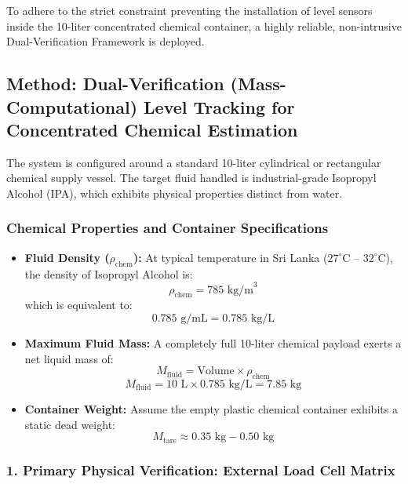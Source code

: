 \documentclass[12pt,a4paper]{article}
\begin{document}
To adhere to the strict constraint preventing the installation of level sensors inside the 10-liter concentrated chemical container, a highly reliable, non-intrusive Dual-Verification Framework is deployed.

\subsection{Method: Dual-Verification (Mass-Computational) Level Tracking for Concentrated Chemical Estimation}

The system is configured around a standard 10-liter cylindrical or rectangular chemical supply vessel. The target fluid handled is industrial-grade Isopropyl Alcohol (IPA), which exhibits physical properties distinct from water.

\subsubsection*{Chemical Properties and Container Specifications}

\begin{itemize}
    \item \textbf{Fluid Density ($\rho_{\text{chem}}$):}
    At typical temperature in Sri Lanka ($27^\circ$C -- $32^\circ$C), the density of Isopropyl Alcohol is:
    \[
    \rho_{\text{chem}} = 785 \text{ kg/m}^3
    \]
    which is equivalent to:
    \[
    0.785 \text{ g/mL} = 0.785 \text{ kg/L}
    \]

    \item \textbf{Maximum Fluid Mass:}
    A completely full 10-liter chemical payload exerts a net liquid mass of:
    \[
    M_{\text{fluid}} = \text{Volume} \times \rho_{\text{chem}}
    \]
    \[
    M_{\text{fluid}} = 10\text{ L} \times 0.785\text{ kg/L} = 7.85\text{ kg}
    \]

    \item \textbf{Container Weight:}
    Assume the empty plastic chemical container exhibits a static dead weight:
    \[
    M_{\text{tare}} \approx 0.35\text{ kg} - 0.50\text{ kg}
    \]
\end{itemize}

\subsubsection*{1. Primary Physical Verification: External Load Cell Matrix}
\end{document}
